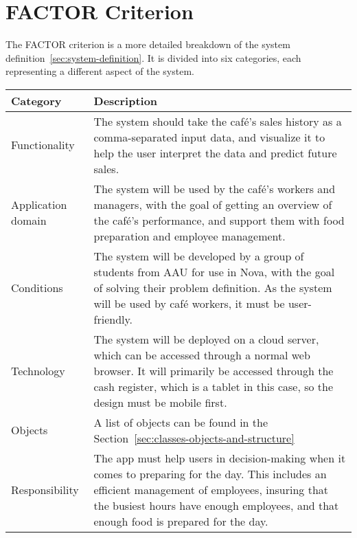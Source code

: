 \section{FACTOR Criterion}\label{sec:factor-criterion}

The FACTOR criterion is a more detailed breakdown of the system definition~\ref{sec:system-definition}.
It is divided into six categories, each representing a different aspect of the system.

\begin{tabular}{ m{2.5cm} m{10cm} }
    \toprule
    \textbf{Category} & \textbf{Description} \\
    \midrule
    Functionality & The system should take the café's sales history as a comma-separated input data, and visualize it to
    help the user interpret the data and predict future sales. \\
    \midrule
    Application domain & The system will be used by the café's workers and managers, with the goal of getting an
    overview of the café's performance, and support them with food preparation and employee management. \\
    \midrule
    Conditions & The system will be developed by a group of students from AAU for use in Nova, with the goal of solving
    their problem definition.
    As the system will be used by café workers, it must be user-friendly. \\
    \midrule
    Technology & The system will be deployed on a cloud server, which can be accessed through a normal web browser.
    It will primarily be accessed through the cash register, which is a tablet in this case, so the design must be
    mobile first. \\
    \midrule
    Objects & A list of objects can be found in the Section~\ref{sec:classes-objects-and-structure} \\
    \midrule
    Responsibility & The app must help users in decision-making when it comes to preparing for the day.
    This includes an efficient management of employees, insuring that the busiest hours have enough employees, and
    that enough food is prepared for the day. \\
    \bottomrule
\end{tabular}
